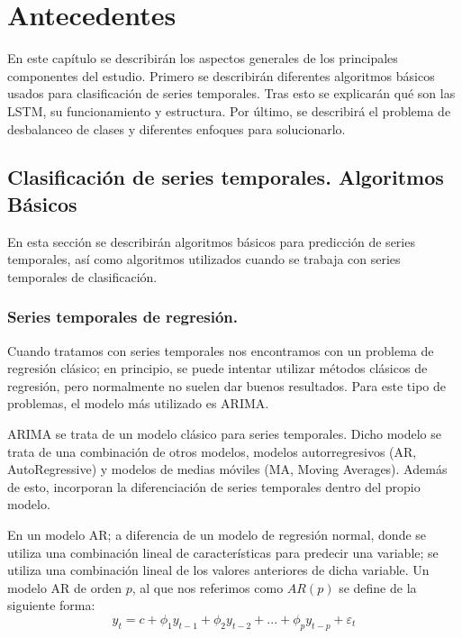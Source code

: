 \chapter{Antecedentes}
En este capítulo se describirán los aspectos generales de los principales componentes del estudio. Primero se describirán diferentes algoritmos básicos usados para clasificación de series temporales. Tras esto se explicarán qué son las LSTM, su funcionamiento y estructura. Por último, se describirá el problema de desbalanceo de clases y diferentes enfoques para solucionarlo.\newline

\section{Clasificación de series temporales. Algoritmos Básicos}
En esta sección se describirán algoritmos básicos para predicción de series temporales, así como algoritmos utilizados cuando se trabaja con series temporales de clasificación.\newline

\subsection{Series temporales de regresión.}
Cuando tratamos con series temporales nos encontramos con un problema de regresión clásico; en principio, se puede intentar utilizar métodos clásicos de regresión, pero normalmente no suelen dar buenos resultados. Para este tipo de problemas, el modelo más utilizado es ARIMA.\newline

ARIMA se trata de un modelo clásico para series temporales. Dicho modelo se trata de una combinación de otros modelos, modelos autorregresivos (AR, AutoRegressive) y modelos de medias móviles (MA, Moving Averages). Además de esto, incorporan la diferenciación de series temporales dentro del propio modelo.\newline

En un modelo AR; a diferencia de un modelo de regresión normal, donde se utiliza una combinación lineal de características para predecir una variable; se utiliza una combinación lineal de los valores anteriores de dicha variable. Un modelo AR de orden $p$, al que nos referimos como $AR(p)$ se define de la siguiente forma:\newline
$$ y_t = c + \phi_1 y_{t-1} + \phi_2 y_{t-2} + ... + \phi_p y_{t-p} + \varepsilon_t $$

